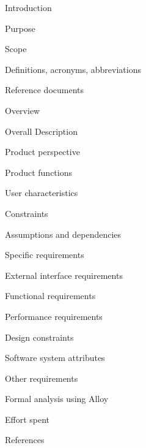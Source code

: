 \documentclass{article}
\begin{document}
	\begin{legal}
 	\item Introduction
  		\begin{legal}
    		\item Purpose
		\item Scope
		\item Definitions, acronyms, abbreviations
		\item Reference documents
		\item Overview	
  		\end{legal}
	\item Overall Description
  		\begin{legal}
    		\item Product perspective
		\item Product functions
		\item User characteristics
		\item Constraints
		\item Assumptions and dependencies
  		\end{legal}
	\item Specific requirements
  		\begin{legal}
    		\item External interface requirements
		\item Functional requirements
		\item Performance requirements
		\item Design constraints
		\item Software system attributes
		\item Other requirements
  		\end{legal}
	\item Formal analysis using Alloy
  	\item Effort spent
	\item References
	\end{legal}
\newpage
\end{document}

